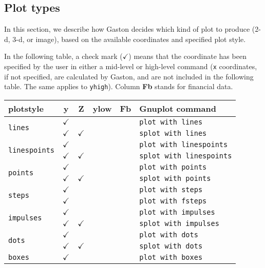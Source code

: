 \documentclass[11pt]{article}
\newcommand{\cm}{$\checkmark$}
\newcommand{\cmd}[1]{\texttt{#1}}
\begin{document}
\subsection{Plot types}

In this section, we describe how Gaston decides which kind of plot to produce
(2-d, 3-d, or image), based on the available coordinates and specified plot
style.

In the following table, a check mark (\cm) means that the coordinate has been
specified by the user in either a mid-level or high-level command (\cmd{x}
coordinates, if not specified, are calculated by Gaston, and are not included
in the following table. The same applies to \cmd{yhigh}). Column \textbf{Fb}
stands for financial data.

{\small
\begin{center}
	\begin{tabular}{lccccl}
	\toprule
	\textbf{plotstyle} & \textbf{y} & \textbf{Z} & \textbf{ylow} & \textbf{Fb}
	& \textbf{Gnuplot command} \\
	\midrule
	\multirow{2}{*}{\cmd{lines}}
	& \cm &     &  & & \cmd{plot with lines} \\
	& \cm & \cm &  & & \cmd{splot with lines} \\
	\cmidrule(r){2-5}
	\multirow{2}{*}{\cmd{linespoints}}
	& \cm &     &  & & \cmd{plot with linespoints} \\
	& \cm & \cm &  & & \cmd{splot with linespoints} \\
	\cmidrule(r){2-5}
	\multirow{2}{*}{\cmd{points}}
	& \cm &     &  & & \cmd{plot with points} \\
	& \cm & \cm &  & & \cmd{splot with points} \\
	\cmidrule(r){2-5}
	\multirow{2}{*}{\cmd{steps}}
	& \cm &     &  & & \cmd{plot with steps} \\
	\cmidrule(r){2-5}
	\multirow{2}{*}{\cmd{fsteps}}
	& \cm &     &  & & \cmd{plot with fsteps} \\
	\cmidrule(r){2-5}
	\multirow{2}{*}{\cmd{impulses}}
	& \cm &     &  & & \cmd{plot with impulses} \\
	& \cm & \cm &  & & \cmd{splot with impulses} \\
	\cmidrule(r){2-5}
	\multirow{2}{*}{\cmd{dots}}
	& \cm &     &  & & \cmd{plot with dots} \\
	& \cm & \cm &  & & \cmd{splot with dots} \\
	\cmidrule(r){2-5}
	\cmd{boxes}         & \cm &  &     & & \cmd{plot with boxes} \\

\end{tabular}
\end{center}}
\end{document}
